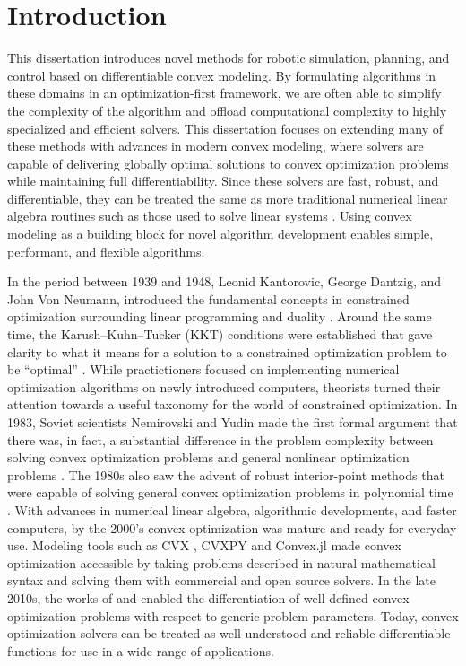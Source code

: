 \chapter{Introduction}

This dissertation introduces novel methods for robotic simulation, planning, and control based on differentiable convex modeling.
By formulating algorithms in these domains in an optimization-first framework, we are often able to simplify the complexity of the algorithm and offload computational complexity to highly specialized and efficient solvers.
This dissertation focuses on extending many of these methods with advances in modern convex modeling, where solvers are capable of delivering globally optimal solutions to convex optimization problems while maintaining full differentiability.
Since these solvers are fast, robust, and differentiable, they can be treated the same as more traditional numerical linear algebra routines such as those used to solve linear systems \cite{boyd2004}.
Using convex modeling as a building block for novel algorithm development enables simple, performant, and flexible algorithms. 

In the period between 1939 and 1948, Leonid Kantorovic, George Dantzig, and John Von Neumann, introduced the fundamental concepts in constrained optimization surrounding linear programming and duality \cite{dantzig1990}.
Around the same time, the Karush–Kuhn–Tucker (KKT) conditions were established that gave clarity to what it means for a solution to a constrained optimization problem to be ``optimal'' \cite{boyd2004}.
While practictioners focused on implementing numerical optimization algorithms on newly introduced computers, theorists turned their attention towards a useful taxonomy for the world of constrained optimization.
In 1983, Soviet scientists Nemirovski and Yudin made the first formal argument that there was, in fact, a substantial difference in the problem complexity between solving convex optimization problems and general nonlinear optimization problems \cite{blair1985}.
The 1980s also saw the advent of robust interior-point methods that were capable of solving general convex optimization problems in polynomial time \cite{mehrotra1992}. 
With advances in numerical linear algebra, algorithmic developments, and faster computers, by the 2000's convex optimization was mature and ready for everyday use.
Modeling tools such as CVX \cite{grant}, CVXPY \cite{diamond} and Convex.jl \cite{udell2014} made convex optimization accessible by taking problems described in natural mathematical syntax and solving them with commercial and open source solvers. 
In the late 2010s, the works of \cite{amos2017} and \cite{agrawal2019} enabled the differentiation of well-defined convex optimization problems with respect to generic problem parameters.
Today, convex optimization solvers can be treated as well-understood and reliable differentiable functions for use in a wide range of applications. 


